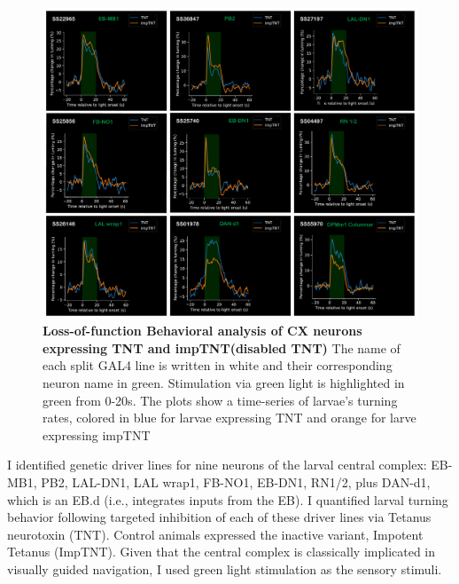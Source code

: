     \begin{figure}
        \centering
        \includegraphics[width=12cm]{Figs/CX/BehaviourAssays.pdf}
        \caption[Loss of Function Analysis during Light Stimulation]{\textbf{Loss-of-function Behavioral analysis of CX neurons expressing TNT and impTNT(disabled TNT)} The name of each split GAL4 line is written in white and their corresponding neuron name in green. Stimulation via green light is highlighted in green from 0-20s. The plots show a time-series of larvae's turning rates, colored in blue for larvae expressing TNT and orange for larve expressing impTNT}
        \label{LOS}
    \end{figure}

    I identified genetic driver lines for nine neurons of the larval central complex: EB-MB1, PB2, LAL-DN1, LAL wrap1, FB-NO1, EB-DN1, RN1/2, plus DAN-d1, which is an EB.d (i.e., integrates inputs from the EB). 
    I quantified larval turning behavior following targeted inhibition of each of these driver lines via Tetanus neurotoxin (TNT).
    Control animals expressed the inactive variant, Impotent Tetanus (ImpTNT).
    Given that the central complex is classically implicated in visually guided navigation, I used green light stimulation as the sensory stimuli.

